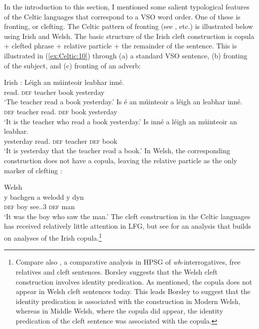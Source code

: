 \documentclass[output=paper,colorlinks,citecolor=brown]{langscibook}
\begin{document}
In the introduction to this section, I mentioned some salient typological features of the Celtic languages that correspond to a VSO word order. One of these is fronting, or clefting. The Celtic pattern of fronting (see \citealt[31--34]{Tallerman1998}, etc.) is illustrated below using Irish and Welsh. The basic structure of the Irish cleft construction is copula + clefted phrase + relative particle + the remainder of the sentence. This is illustrated in (\ref{ex:Celtic:10}) through (a) a standard VSO sentence, (b) fronting of the subject, and (c) fronting of an adverb:

\ea\label{ex:Celtic:10} Irish \citep[571]{Sulger09}:
\ea
\gll L\'eigh an múinteoir leabhar inn\'e.\\
{read.\PST} {\textsc{def}} teacher book yesterday\\
\glt`The teacher read a book yesterday.'
\ex
\gll Is  \'e an múinteoir a l\'eigh an leabhar inn\'e.\\
{\COP}  {\AGR} \textsc{def} teacher {\REL} {read.\PST} \textsc{def} book yesterday\\
\glt`It is the teacher who read a book yesterday.'
\ex
\gll Is inn\'e  a l\'eigh an múinteoir an leabhar.\\
{\COP} yesterday {\REL} {read.\PST} \textsc{def} teacher \textsc{def} book\\
\glt`It is yesterday that the teacher read a book.'
\z\z
In Welsh, the corresponding construction does not have a copula, leaving the relative particle as the only marker of clefting \citep[336--337]{Watkins2002}:

\ea\label{ex:Celtic:11} Welsh \citep[337]{Watkins2002}\\
\gll y bachgen a welodd y dyn\\
\textsc{def} boy  {\REL} {see.\PST.3\SG} \textsc{def} man\\
\glt`It was the boy who saw the man.'
\z
The cleft construction in the Celtic languages has received relatively little attention in LFG, but see \citet{Sulger09} for an analysis that builds on analyses of the Irish copula.\footnote{Compare also \citet{Borsley2020}, a comparative analysis in HPSG of \emph{wh}-interrogatives, free relatives and cleft sentences. Borsley suggests that the Welsh cleft construction involves identity predication. As mentioned, the copula does not appear in Welsh cleft sentences today. This leads Borsley to suggest that the identity predication is associated with the construction in Modern Welsh, whereas in Middle Welsh, where the copula did appear, the identity predication of the cleft sentence was associated with the copula.} 
\end{document}
